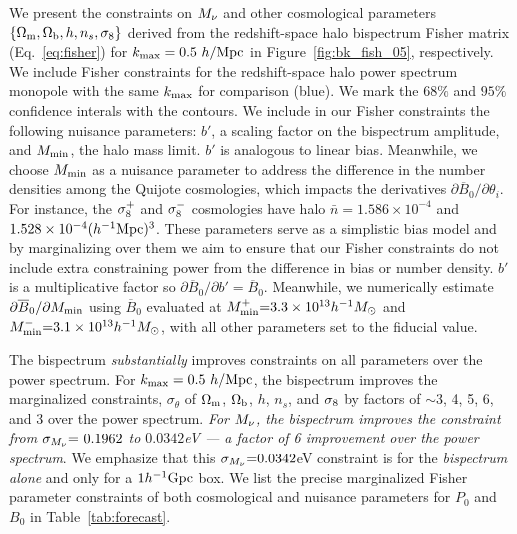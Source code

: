 We present the constraints on $M_\nu$ and other cosmological parameters 
$\{\Omega_{\rm m}, \Omega_{\rm b}, h, n_s, \sigma_8\}$ derived from the redshift-space halo bispectrum 
Fisher matrix (Eq.~\ref{eq:fisher}) for $k_{\rm max} = 0.5~h/{\rm Mpc}$ 
in Figure~\ref{fig:bk_fish_05}, respectively. 
We include Fisher constraints for the redshift-space halo power spectrum 
monopole with the same $k_{\rm max}$ for comparison (blue). We mark the 
$68\%$ and $95\%$ confidence interals with the contours. We include in our 
Fisher constraints the following nuisance parameters: $b'$, a scaling factor 
on the bispectrum amplitude, and $M_{\rm min}$, the halo mass limit. $b'$ is 
analogous to linear bias. Meanwhile, we choose $M_{\rm min}$ as a nuisance
parameter to address the difference in the number densities among the Quijote
cosmologies, which impacts the derivatives $\partial \overline{B}_0/\partial \theta_i$. 
For instance, the $\sigma_8^{+}$ and $\sigma_8^{-}$ cosmologies have halo 
$\bar{n} = 1.586\times10^{-4}$ and $1.528 \times 10^{-4}(h^{-1}{\rm Mpc})^3$. 
These parameters serve as a simplistic bias model and by marginalizing 
over them we aim to ensure that our Fisher constraints do not include extra 
constraining power from the difference in bias or number density. $b'$ is a 
multiplicative factor so $\partial \overline{B}_0/\partial b' = \overline{B}_0$. 
Meanwhile, we numerically estimate $\partial \overline{B}_0/\partial M_{\rm min}$ 
using $\overline{B}_0$ evaluated at $M^{+}_{\rm min}{=}3.3\times10^{13}h^{-1}M_\odot$ 
and $M^{-}_{\rm min}{=}3.1\times10^{13}h^{-1}M_\odot$, with all other parameters 
set to the fiducial value. 

The bispectrum {\em substantially} improves constraints on all parameters 
over the power spectrum. For $k_{\rm max} = 0.5~h/{\rm Mpc}$, the 
bispectrum improves the marginalized constraints, $\sigma_\theta$ of $\Omega_{\rm m}$, 
$\Omega_{\rm b}$, $h$, $n_s$, and $\sigma_8$ by factors of $\sim$3, 4, 5, 6, and 3 over 
the power spectrum. {\em For $M_\nu$, the bispectrum improves the constraint 
from $\sigma_{M_\nu}{=}~0.1962$ to $0.0342$eV --- a factor of 6 improvement 
over the power spectrum}. We emphasize that this $\sigma_{M_\nu}{=}0.0342$eV 
constraint is for the {\em bispectrum alone} and only for a $1h^{-1}{\rm Gpc}$ 
box. We list the precise marginalized Fisher parameter constraints of both 
cosmological and nuisance parameters for $P_0$ and $B_0$ in Table~\ref{tab:forecast}. 

